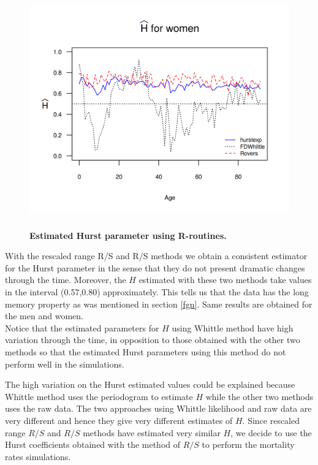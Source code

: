 \documentclass[smallextended]{svjour3}
\begin{document}
\begin{figure}[H]
    \includegraphics[width = 4.5in,  height=4in]{Hurst-Women.png}
    \caption{\bf Estimated Hurst parameter using R-routines.}
    \label{graph-Hurst_Est_Wo}
\end{figure}\vspace*{0.1cm}

With the rescaled range R/S and R/S  methods we obtain a consistent estimator 
for the Hurst
parameter in the sense that they do not present dramatic changes through the 
time. Moreover,
the $H$ estimated with these two methods take values in the interval
(0.57,0.80) approximately. This tells us that the data has the long memory 
property as
was mentioned in section \ref{fgn}. Same results are obtained for the men and 
women.\\


Notice that the estimated parameters for $H$ using Whittle method have high 
variation through the time, in opposition to those
obtained with the other two methods so that the estimated
Hurst parameters using this method do not perform well in the simulations.

The high variation on the Hurst estimated values could be explained because 
Whittle method uses
the periodogram to estimate $H$ while the other two methods uses the raw data. 
The two approaches using Whittle likelihood and raw data are very different and 
hence they give very different estimates of $H$. Since rescaled range $R/S$ and 
$R/S$  methods have estimated very similar $H$, we decide to use the Hurst 
coefficients obtained with the
method of $R/S$ to perform the mortality rates simulations. \\
\end{document}

